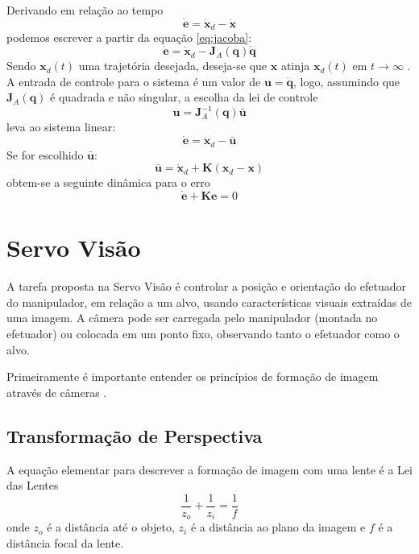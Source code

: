 Derivando em relação ao tempo
\begin{equation}
\bm{\dot{e}} = \bm{\dot{x}}_d - \bm{\dot{x}}
\end{equation}
podemos escrever a partir da equação \ref{eq:jacoba}:
\begin{equation}
\bm{\dot{e}} = \bm{\dot{x}}_d - \bm{J}_A(\bm{q})\dot{\bm{q}}
\end{equation}
Sendo $\bm{x}_d(t)$ uma trajetória desejada, deseja-se que $\bm{x}$ atinja $\bm{x}_d(t)$ em $t \to \infty$ .
A entrada de controle para o sistema é um valor de $\bm{u} = \dot{\bm{q}}$, logo, assumindo que $\bm{J}_A(\bm{q})$ é quadrada e não singular, a escolha da lei de controle
\begin{equation}
\bm{u} = \bm{J}_A^{-1}(\bm{q})\bar{\bm{u}}
\end{equation}
leva ao sistema linear:
\begin{equation}
\dot{\bm{e}} = \dot{\bm{x}}_d - \bar{\bm{u}}
\end{equation}
Se for escolhido $\bar{\bm{u}}$:
\begin{equation}
\bar{\bm{u}} = \dot{\bm{x}}_d + \bm{K} (\bm{x}_d - \bm{x})
\end{equation}
obtem-se a seguinte dinâmica para o erro
\begin{equation}
\dot{\bm{e}} + \bm{K} \bm{e} = 0
\end{equation}

\section{Servo Visão}
A tarefa proposta na Servo Visão é controlar a posição e orientação do efetuador do manipulador, em relação a um alvo, usando características visuais extraídas de uma imagem. A câmera pode ser carregada pelo manipulador (montada no efetuador) ou colocada em um ponto fixo, observando tanto o efetuador como o alvo.

Primeiramente é importante entender os princípios de formação de imagem através de câmeras \cite{petercorke}. 

\subsection{Transformação de Perspectiva}
A equação elementar para descrever a formação de imagem com uma lente é a Lei das Lentes
\begin{equation} 
\frac{1}{z_o} + \frac{1}{z_i} = \frac{1}{f}
\end{equation} 
onde $z_o$ é a distância até o objeto, $z_i$ é a distância ao plano da imagem e $f$ é a distância focal da lente.

